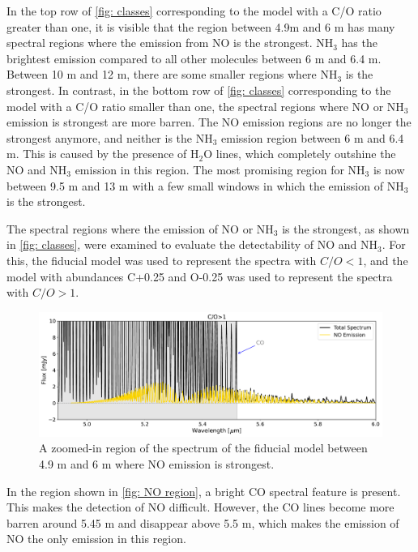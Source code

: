 \documentclass[oneside, single, authoryear, semicolon, 12pt]{lion-msc}
\newcommand{\4}{$_4$}
\newcommand{\3}{$_3$}
\newcommand{\2}{$_2$}
\begin{document}
In the top row of \autoref{fig: classes} corresponding to the model with a C/O ratio greater than one, it is visible that the region between 4.9\textmu m and 6 \textmu m has many spectral regions where the emission from NO is the strongest. NH\3 has the brightest emission compared to all other molecules between 6 \textmu m and 6.4 \textmu m. Between 10 \textmu m and 12 \textmu m, there are some smaller regions where NH\3 is the strongest. In contrast, in the bottom row of \autoref{fig: classes} corresponding to the model with a C/O ratio smaller than one, the spectral regions where NO or NH\3 emission is strongest are more barren. The NO emission regions are no longer the strongest anymore, and neither is the NH\3 emission region between 6 \textmu m and 6.4 \textmu m. This is caused by the presence of H\2O lines, which completely outshine the NO and NH\3 emission in this region. The most promising region for NH\3 is now between 9.5 \textmu m and 13 \textmu m with a few small windows in which the emission of NH\3 is the strongest.

The spectral regions where the emission of NO or NH\3 is the strongest, as shown in \autoref{fig: classes}, were examined to evaluate the detectability of NO and NH\3. For this, the fiducial model was used to represent the spectra with $C/O<1$, and the model with abundances C+0.25 and O-0.25 was used to represent the spectra with $C/O>1$.

\begin{figure}[H]
    \centering
    \includegraphics[width=\linewidth]{Figures/NO_region.pdf}
    \caption{A zoomed-in region of the spectrum of the fiducial model between 4.9 \textmu m and 6 \textmu m where NO emission is strongest.}
    \label{fig: NO region}
\end{figure}

In the region shown in \autoref{fig: NO region}, a bright CO spectral feature is present. This makes the detection of NO difficult. However, the CO lines become more barren around 5.45 \textmu m and disappear above 5.5 \textmu m, which makes the emission of NO the only emission in this region. 
\end{document}
